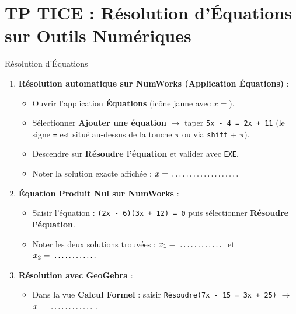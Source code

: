 \section{TP TICE : Résolution d'Équations sur Outils Numériques}

\begin{tpinfo}{Résolution d'Équations}
\begin{enumerate}
    \item \textbf{Résolution automatique sur NumWorks (Application Équations)} :
    \begin{itemize}
        \item Ouvrir l'application \textbf{Équations} (icône jaune avec $x=$).
        \item Sélectionner \textbf{Ajouter une équation} $\rightarrow$ taper \texttt{5x - 4 = 2x + 11} (le signe \texttt{=} est situé au-dessus de la touche $\pi$ ou via \texttt{shift} + $\pi$).
        \item Descendre sur \textbf{Résoudre l'équation} et valider avec \texttt{EXE}.
        \item Noter la solution exacte affichée : $x = \pointille[3cm]$
    \end{itemize}
    \item \textbf{Équation Produit Nul sur NumWorks} :
    \begin{itemize}
        \item Saisir l'équation : \texttt{(2x - 6)(3x + 12) = 0} puis sélectionner \textbf{Résoudre l'équation}.
        \item Noter les deux solutions trouvées : $x_1 = \pointille[2cm]$ \quad et \quad $x_2 = \pointille[2cm]$
    \end{itemize}
    \item \textbf{Résolution avec GeoGebra} :
    \begin{itemize}
        \item Dans la vue \textbf{Calcul Formel} : saisir \texttt{Résoudre(7x - 15 = 3x + 25)} $\rightarrow$ $x = \pointille[2cm]$.
    \end{itemize}
\end{enumerate}
\end{tpinfo}

